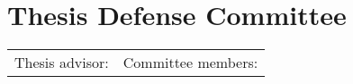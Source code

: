 \normalsize


\chapter*{Thesis Defense Committee}


\begin{tabular}{ll}
\begin{minipage}{.46\textwidth}
Thesis advisor: 
\vspace{.5em}

\end{minipage}
& 
\begin{minipage}{.47\textwidth}
Committee members: 
\end{minipage}


\end{tabular}



\justify
